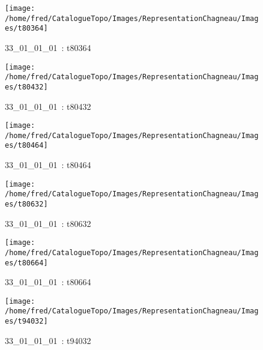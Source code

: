 \documentclass[12pt,titlepage]{book}
\begin{document}
\begin{figure}[h!]
\begin{minipage}[t]{3cm}
    \begin{center}
      \texttt{[image: /home/fred/CatalogueTopo/Images/RepresentationChagneau/Images/t80364]}
      \caption[~33\_01\_01\_01]{\small{33\_01\_01\_01~:} \tiny{t80364}}\label{t80364}
    \end{center}
  \end{minipage}
  \begin{minipage}[t]{3cm}
    \begin{center}
      \texttt{[image: /home/fred/CatalogueTopo/Images/RepresentationChagneau/Images/t80432]}
      \caption[~33\_01\_01\_01]{\small{33\_01\_01\_01~:} \tiny{t80432}}\label{t80432}
    \end{center}
  \end{minipage}
  \begin{minipage}[t]{3cm}
    \begin{center}
      \texttt{[image: /home/fred/CatalogueTopo/Images/RepresentationChagneau/Images/t80464]}
      \caption[~33\_01\_01\_01]{\small{33\_01\_01\_01~:} \tiny{t80464}}\label{t80464}
    \end{center}
  \end{minipage}
  \begin{minipage}[t]{3cm}
    \begin{center}
      \texttt{[image: /home/fred/CatalogueTopo/Images/RepresentationChagneau/Images/t80632]}
      \caption[~33\_01\_01\_01]{\small{33\_01\_01\_01~:} \tiny{t80632}}\label{t80632}
    \end{center}
  \end{minipage}
  \begin{minipage}[t]{3cm}
    \begin{center}
      \texttt{[image: /home/fred/CatalogueTopo/Images/RepresentationChagneau/Images/t80664]}
      \caption[~33\_01\_01\_01]{\small{33\_01\_01\_01~:} \tiny{t80664}}\label{t80664}
    \end{center}
  \end{minipage}
  \begin{minipage}[t]{3cm}
    \begin{center}
      \texttt{[image: /home/fred/CatalogueTopo/Images/RepresentationChagneau/Images/t94032]}
      \caption[~33\_01\_01\_01]{\small{33\_01\_01\_01~:} \tiny{t94032}}\label{t94032}

\end{center}
\end{minipage}
\end{figure}
\end{document}
